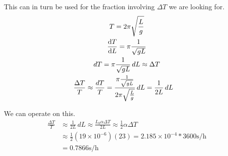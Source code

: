 \documentclass[12pt]{article}
\begin{document}
            This can in turn be used for the fraction involving $\Delta T$ we are looking for.
            \begin{gather}
                T   =   2\pi \sqrt{\frac{L}{g}}\\
                \dv{T}{L}   =   \pi \frac{1}{\sqrt{gL}}\\
                dT  =   \pi \frac{1}{\sqrt{gL}}\,dL \approx \Delta T\\
                \begin{align}
                    \frac{\Delta T}{T}  &\approx    \frac{dT}{T}
                        =   \frac{\pi \frac{1}{\sqrt{gL}}}{2\pi \sqrt{\frac{L}{g}}}\,dL
                        =   \frac{1}{2L}\,dL
                \end{align}
            \end{gather}

            We can operate on this.
            \begin{align}
                \frac{\Delta T}{T}  &\approx    \frac{1}{2L}\,dL
                    \approx \frac{L_0 \alpha \Delta T}{2L}
                    \approx \frac{1}{2} \alpha \Delta T\\
                    &\approx    \frac{1}{2} (19 \times 10^{-6}) (23)
                    =   2.185 \times 10^{-4} * 3600 \unit{\second/\hour}\\
                    &=  \boxed{0.7866 \unit{\second/\hour}}
            \end{align}

    \pagebreak

    \tableofcontents
\end{document}
